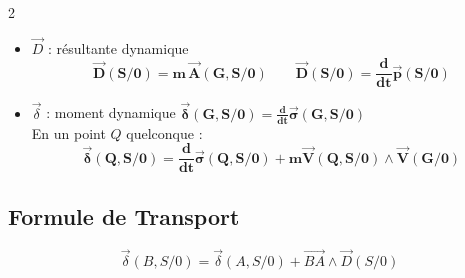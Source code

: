 \documentclass[10pt,a4paper]{article}
\renewcommand{\vec}{\overrightarrow}
\begin{document}
\begin{multicols}{2}
            \begin{itemize}
                \item $\vec D$ : résultante dynamique
                $$ \bm{\vec D(S/0) = m \,\vec A(G, S/0) \qquad \vec D(S/0) = \frac{d}{dt}\vec p(S/0)} $$
                \item $\vec \delta$ : moment dynamique  $ \bm{\vec \delta (G, S/0) = \frac{d}{dt} \vec \sigma (G, S/0)} $ \\
                En un point $Q$ quelconque :
                $$ \bm{\vec \delta (Q, S/0) = \frac{d}{dt} \vec \sigma (Q, S/0)
                  + m \vec V(Q, S/0) \wedge \vec V(G/0)} $$
            \end{itemize}

            \subsection*{Formule de Transport}                
                  $$ \vec \delta (B, S/0) = \vec \delta (A, S/0) + \vec{BA} \wedge \vec D(S/0) $$
        \end{multicols}
        \clearpage
\end{document}
